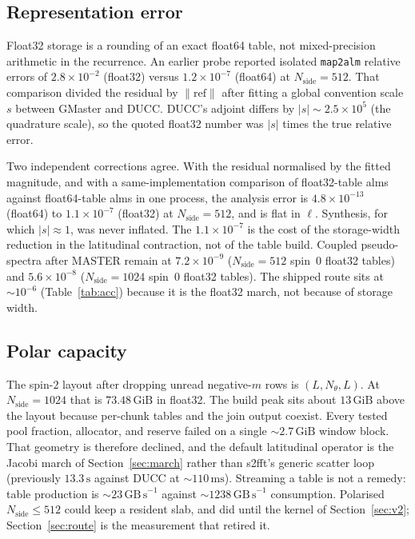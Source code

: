 \documentclass[usenatbib,useAMS]{mnras}
\begin{document}
\subsection{Representation error}

Float32 storage is a rounding of an exact float64 table, not mixed-precision arithmetic in the recurrence. An earlier probe reported isolated \texttt{map2alm} relative errors of $2.8\times10^{-2}$ (float32) versus $1.2\times10^{-7}$ (float64) at $N_{\mathrm{side}}=512$. That comparison divided the residual by $\lVert\mathrm{ref}\rVert$ after fitting a global convention scale $s$ between GMaster and DUCC. DUCC's adjoint differs by $\lvert s\rvert\sim2.5\times10^5$ (the quadrature scale), so the quoted float32 number was $\lvert s\rvert$ times the true relative error.

Two independent corrections agree. With the residual normalised by the fitted magnitude, and with a same-implementation comparison of float32-table alms against float64-table alms in one process, the analysis error is $4.8\times10^{-13}$ (float64) to $1.1\times10^{-7}$ (float32) at $N_{\mathrm{side}}=512$, and is flat in $\ell$. Synthesis, for which $\lvert s\rvert\approx1$, was never inflated. The $1.1\times10^{-7}$ is the cost of the storage-width reduction in the latitudinal contraction, not of the table build. Coupled pseudo-spectra after MASTER remain at $7.2\times10^{-9}$ ($N_{\mathrm{side}}=512$ spin~$0$ float32 tables) and $5.6\times10^{-8}$ ($N_{\mathrm{side}}=1024$ spin~$0$ float32 tables). The shipped route sits at $\sim10^{-6}$ (Table~\ref{tab:acc}) because it is the float32 march, not because of storage width.

\subsection{Polar capacity}

The spin-$2$ layout after dropping unread negative-$m$ rows is $(L,N_\theta,L)$. At $N_{\mathrm{side}}=1024$ that is $73.48\,\mathrm{GiB}$ in float32. The build peak sits about $13\,\mathrm{GiB}$ above the layout because per-chunk tables and the join output coexist. Every tested pool fraction, allocator, and reserve failed on a single $\sim2.7\,\mathrm{GiB}$ window block. That geometry is therefore declined, and the default latitudinal operator is the Jacobi march of Section~\ref{sec:march} rather than s2fft's generic scatter loop (previously $13.3\,\mathrm{s}$ against DUCC at $\sim110\,\mathrm{ms}$). Streaming a table is not a remedy: table production is $\sim23\,\mathrm{GB\,s}^{-1}$ against $\sim1238\,\mathrm{GB\,s}^{-1}$ consumption. Polarised $N_{\mathrm{side}}\le512$ could keep a resident slab, and did until the kernel of Section~\ref{sec:v2}; Section~\ref{sec:route} is the measurement that retired it.
\end{document}
